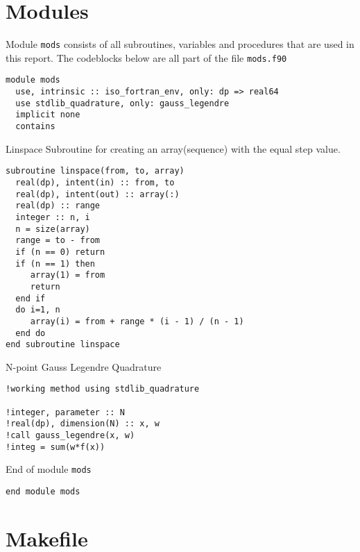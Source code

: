 \documentclass[a4paper,11pt,twoside]{article}
\begin{document}
\clearpage

\section{Modules}
\label{sec:orge5d4f08}

Module \texttt{mods} consists of all subroutines, variables and procedures that are used in this report. The codeblocks below are all part of the file \texttt{mods.f90}

\begin{verbatim}
module mods
  use, intrinsic :: iso_fortran_env, only: dp => real64
  use stdlib_quadrature, only: gauss_legendre
  implicit none
  contains
\end{verbatim}

Linspace Subroutine for creating an array(sequence) with the equal step value.

\begin{verbatim}
subroutine linspace(from, to, array)
  real(dp), intent(in) :: from, to
  real(dp), intent(out) :: array(:)
  real(dp) :: range
  integer :: n, i
  n = size(array)
  range = to - from
  if (n == 0) return
  if (n == 1) then
     array(1) = from
     return
  end if
  do i=1, n
     array(i) = from + range * (i - 1) / (n - 1)
  end do
end subroutine linspace
\end{verbatim}

N-point Gauss Legendre Quadrature


\begin{verbatim}
!working method using stdlib_quadrature

!integer, parameter :: N
!real(dp), dimension(N) :: x, w
!call gauss_legendre(x, w)
!integ = sum(w*f(x))
\end{verbatim}

End of module \texttt{mods}

\begin{verbatim}
end module mods
\end{verbatim}


\clearpage

\section{Makefile}
\label{sec:orge5ba678}
\end{document}
